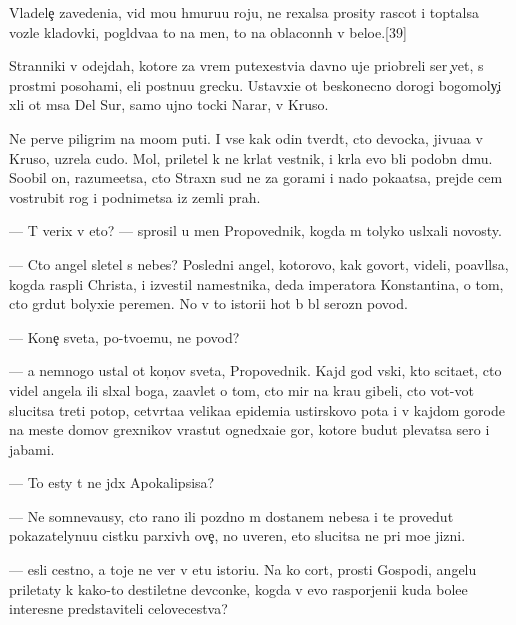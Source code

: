 \documentclass[10pt]{book}
\begin{document}
Vladele{\c} zavedeni{\y}a, vid{\ia} mo{\y}u hmuru{\y}u roju, ne rexalsa prosity rascot i toptalsa vozle kladovki, pogl{\ia}d{\yi}va{\y}a to na men{\ia}, to na oblaconn{\yi}h v belo{\y}e.[39]

Stranniki v odejdah, kotor{\yi}{\y}e za vrem{\ia} putexestvi{\y}a davno uje priobreli ser{\yi}{\y} {\c}vet, s prost{\yi}mi posohami, {\y}eli postnu{\y}u grecku. Ustavxi{\y}e ot beskonecno{\y} dorogi bogomoly{\c}i xli ot m{\yi}sa Del Sur, samo{\y} {\y}ujno{\y} tocki Narar{\yi}, v Kruso.

Ne perv{\yi}{\y}e piligrim{\yi} na mo{\y}om puti. I vse kak odin tverd{\ia}t, cto devocka, jivu{\x}a{\y}a v Kruso, uzrela cudo. Mol, priletel k ne{\y} kr{\yi}lat{\yi}{\y} vestnik, i kr{\yi}l{\y}a {\y}evo b{\yi}li podobn{\yi} d{\yi}mu. Soob{\x}il on, razume{\y}etsa, cto Straxn{\yi}{\y} sud ne za gorami i nado poka{\y}atsa, prejde cem vostrubit rog i podnimetsa iz zemli prah.

— T{\yi} verix v eto? — sprosil u men{\ia} Propovednik, kogda m{\yi} tolyko usl{\yi}xali novosty.

— Cto angel sletel s nebes? Posledni{\y} angel, kotorovo, kak govor{\ia}t, videli, po{\y}avl{\ia}lsa, kogda rasp{\ia}li Christa, i izvestil namestnika, deda imperatora Konstantina, o tom, cto gr{\ia}dut bolyxi{\y}e peremen{\yi}. No v to{\y} istori{\y}i hot{\ia} b{\yi} b{\yi}l ser{\y}ozn{\yi}{\y} povod.

— Kone{\c} sveta, po-tvo{\y}emu, ne povod?

— {\Y}a nemnogo ustal ot kon{\c}ov sveta, Propovednik. Kajd{\yi}{\y} god vs{\ia}ki{\y}, kto scita{\y}et, cto videl angela ili sl{\yi}xal boga, za{\y}avl{\ia}{\y}et o tom, cto mir na kra{\y}u gibeli, cto vot-vot slucitsa treti{\y} potop, cetv{\e}rta{\y}a velika{\y}a epidemi{\y}a {\y}ustirskovo pota i v kajdom gorode na meste domov grexnikov v{\yi}rastut ogned{\yi}xa{\x}i{\y}e gor{\yi}, kotor{\yi}{\y}e budut plevatsa sero{\y} i jabami.

— To {\y}esty t{\yi} ne jd{\e}x Apokalipsisa?

— Ne somneva{\y}usy, cto rano ili pozdno m{\yi} dostanem nebesa i te provedut pokazatelynu{\y}u cistku parxiv{\yi}h ove{\c}, no uveren, eto slucitsa ne pri mo{\y}e{\y} jizni.

— {\Y}esli cestno, {\y}a toje ne ver{\iu} v etu istori{\y}u. Na ko{\y} cort, prosti Gospodi, angelu priletaty k kako{\y}-to des{\ia}tiletne{\y} devconke, kogda v {\y}evo raspor{\ia}jeni{\y}i kuda bole{\y}e interesn{\yi}{\y}e predstaviteli celovecestva?
\end{document}
